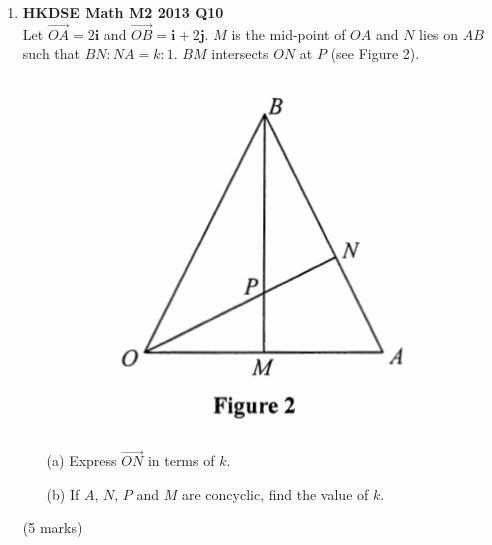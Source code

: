 \documentclass{report}
\begin{document}
\begin{enumerate}
	\newpage
	
	\item \textbf{HKDSE Math M2 2013 Q10}\\
	Let $\overrightarrow{OA} = 2\textbf{i}$ and 
	$\overrightarrow{OB} = \textbf{i} +2 \textbf{j}$. $M$ is the mid-point of $OA$ and $N$ lies on $AB$ such that $BN : NA = k: 1$. $BM$ intersects $ON$ at $P$ (see Figure 2).
	\begin{figure}[H]
		\centering
		\includegraphics[width = .5\linewidth]{2013Figure2}
	\end{figure}
	\begin{enumerate}
		\item [(a)]Express $\overrightarrow{ON}$ in terms of $k$.
		\item [(b)]If $A$, $N$, $P$ and $M$ are concyclic, find the value of $k$.
	\end{enumerate}
	(5 marks)


\end{enumerate}
\end{document}
